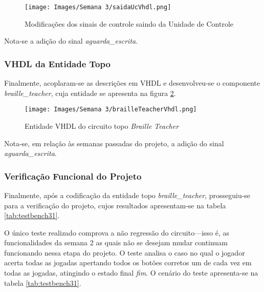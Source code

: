 \documentclass[amsmath,amssymb,floatfix]{report}
\begin{document}
\begin{figure}[H]
    \centering
    \texttt{[image: Images/Semana 3/saidaUcVhdl.png]}
    \caption{Modificações dos sinais de controle saindo da Unidade de Controle}
    \label{fig:saidaUcVhdl3}
\end{figure}

Nota-se a adição do sinal \textit{aguarda\_escrita}.

\subsubsection{VHDL da Entidade Topo}
\label{subsubsec:btVhdl3}

Finalmente, acoplaram-se as descrições em VHDL e desenvolveu-se o componente \textit{braille\_teacher}, cuja entidade se apresenta na figura \ref{fig:brailleTeacherVhdl3}.

\begin{figure}[H]
    \centering
    \texttt{[image: Images/Semana 3/brailleTeacherVhdl.png]}
    \caption{Entidade VHDL do circuito topo \textit{Braille Teacher}}
    \label{fig:brailleTeacherVhdl3}
\end{figure}

Nota-se, em relação às semanas passadas do projeto, a adição do sinal \textit{aguarda\_escrita}.


\subsubsection{Verificação Funcional do Projeto}
\label{subsubsec:tbVhdl3}

Finalmente, após a codificação da entidade topo \textit{braille\_teacher}, prosseguiu-se para a verificação do projeto, cujos resultados apresentam-se na tabela \ref{tab:testbench31}.

O único teste realizado comprova a não regressão do circuito---isso é, as funcionalidades da semana 2 as quais não se desejam mudar continuam funcionando nessa etapa do projeto. O teste analisa o caso no qual o jogador acerta todas as jogadas apertando todos os botões corretos um de cada vez em todas as  jogadas, atingindo o estado final \textit{fim}. O cenário do teste apresenta-se na tabela \ref{tab:testbench31}.
\end{document}

